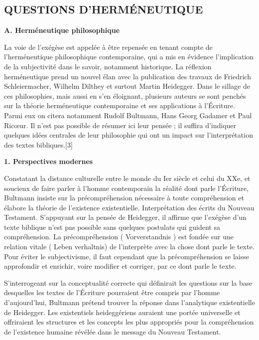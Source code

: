  \subsection{QUESTIONS D'HERMÉNEUTIQUE  }


  

\textbf{A. Herméneutique philosophique  }

La voie de l'exégèse est appelée à être repensée en tenant compte de l'herméneutique philosophique contemporaine, qui a mis en évidence l'implication de la subjectivité dans le savoir, notamment historique. La réflexion herméneutique prend un nouvel élan avec la publication des travaux de Friedrich Schleiermacher, Wilhelm Dilthey et surtout Martin Heidegger. Dans le sillage de ces philosophies, mais aussi en s'en éloignant, plusieurs auteurs se sont penchés sur la théorie herméneutique contemporaine et ses applications à l'Écriture. Parmi eux on citera notamment Rudolf Bultmann, Hans Georg Gadamer et Paul Ricœur. Il n'est pas possible de résumer ici leur pensée ; il suffira d'indiquer quelques idées centrales de leur philosophie qui ont un impact sur l'interprétation des textes bibliques.[3]   

\textbf{1. Perspectives modernes  }

Constatant la distance culturelle entre le monde du Ier siècle et celui du XXe, et soucieux de faire parler à l'homme contemporain la réalité dont parle l'Écriture, Bultmann insiste sur la précompréhension nécessaire à toute compréhension et élabore la théorie de l'existence existentielle. Interprétation des écrits du Nouveau Testament. S'appuyant sur la pensée de Heidegger, il affirme que l'exégèse d'un texte biblique n'est pas possible sans quelques postulats qui guident sa compréhension. La précompréhension ( Vorverstandnis ) est fondée sur une relation vitale ( Leben verhaltnis) de l'interprète avec la chose dont parle le texte. Pour éviter le subjectivisme, il faut cependant que la précompréhension se laisse approfondir et enrichir, voire modifier et corriger, par ce dont parle le texte.   

S'interrogeant sur la conceptualité correcte qui définirait les questions sur la base desquelles les textes de l'Écriture pourraient être compris par l'homme d'aujourd'hui, Bultmann prétend trouver la réponse dans l'analytique existentielle de Heidegger. Les existentiels heideggériens auraient une portée universelle et offriraient les structures et les concepts les plus appropriés pour la compréhension de l'existence humaine révélée dans le message du Nouveau Testament.   

